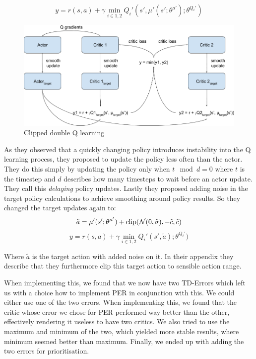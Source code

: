 \documentclass[hyperref,beleg]{cgvpub}
\begin{document}
\begin{equation}
y = r(s, a) + \gamma \min_{i \in {1,2}} Q_i'(s', \mu'(s';\theta^{\mu'});\theta^{Q_i'})
\end{equation}

\begin{figure}
  \centering
  \includegraphics[width=\linewidth]{images/TD3-Setup.png}
  \caption{Clipped double Q learning}
  \label{fig:clippedq}
\end{figure}

As they observed that a quickly changing policy introduces instability into the Q learning process, they proposed to update the policy less often than the actor. They do this simply by updating the policy only when $t\mod d = 0$ where $t$ is the timestep and $d$ describes how many timesteps to wait before an actor update. They call this \textit{delaying} policy updates. Lastly they proposed adding noise in the target policy calculations to achieve smoothing around policy results. So they changed the target updates again to:
\begin{equation}
\tilde{a} = \mu'(s';\theta^{\mu'}) + \text{clip}(\mathcal{N}(0, \tilde{\sigma}), -\tilde{c}, \tilde{c})\\
\end{equation}
\begin{equation}
y = r(s, a) + \gamma \min_{i \in {1,2}} Q_i'(s', \tilde{a});\theta^{Q_i'})
\end{equation}

Where $\tilde{a}$ is the target action with added noise on it. In their appendix they describe that they furthermore clip this target action to sensible action range.

When implementing this, we found that we now have two \ac{TD-Error}s which left us with a choice how to implement \ac{PER} in conjunction with this. We could either use one of the two errors. When implementing this, we found that the critic whose error we chose for \ac{PER} performed way better than the other, effectively rendering it useless to have two critics. We also tried to use the maximum and minimum of the two, which yielded more stable results, where minimum seemed better than maximum. Finally, we ended up with adding the two errors for prioritisation.
\end{document}

